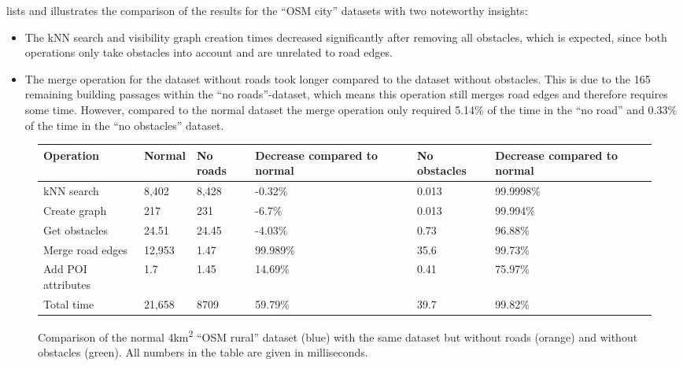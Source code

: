 			 lists and illustrates the comparison of the results for the \enquote{OSM city} datasets with two noteworthy insights:
			\begin{itemize}
				\item The kNN search and visibility graph creation times decreased significantly after removing all obstacles, which is expected, since both operations only take obstacles into account and are unrelated to road edges.
				\item The merge operation for the dataset without roads took longer compared to the dataset without obstacles.
				This is due to the 165 remaining building passages within the \enquote{no roads}-dataset, which means this operation still merges road edges and therefore requires some time.
				However, compared to the normal dataset the merge operation only required 5.14\% of the time in the \enquote{no road} and 0.33\% of the time in the \enquote{no obstacles} dataset.
			\end{itemize}
			
			\begin{figure}[h!]
				\begin{tabularx}{0.95\textwidth}{p{3cm}|X|XX|p{2.25cm}X}
\textbf{Operation} & \textbf{Normal} & \textbf{No roads} & \textbf{Decrease compared to normal} & \textbf{No obstacles} & \textbf{Decrease compared to normal} \\
\hline
kNN search			& 8,402		& 8,428		& -0.32\%						& 0.013			& 99.9998\%						\\
Create graph		& 217		& 231		& -6.7\%						& 0.013			& 99.994\%						\\
Get obstacles		& 24.51		& 24.45		& -4.03\%						& 0.73			& 96.88\%						\\
Merge road edges	& 12,953	& 1.47		& 99.989\%						& 35.6			& 99.73\%						\\
Add POI attributes	& 1.7		& 1.45		& 14.69\%						& 0.41			& 75.97\%						\\
\hline
Total time			& 21,658	& 8709		& 59.79\%						& 39.7			& 99.82\%
				\end{tabularx}
				\vspace{3ex}
				\begin{figcenter}
					
				\end{figcenter}
				\caption{Comparison of the normal 4km\textsuperscript{2} \enquote{OSM rural} dataset (blue) with the same dataset but without roads (orange) and without obstacles (green). All numbers in the table are given in milliseconds.}
				\label{fig:eval-import-osm-no-roads-obstacles-rural}
			\end{figure}
			
